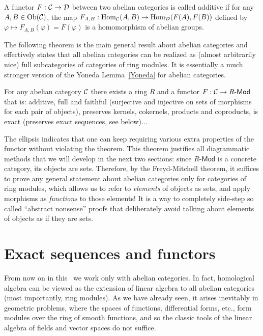 \begin{defn}
    A functor $F:\mathcal{C}\to\mathcal{D}$ between two abelian categories is called additive if for any $A,B\in\operatorname{Ob}(\mathcal{C})$, the map $F_{A,B}:\operatorname{Hom}_{\mathcal{C}}(A,B)\to \operatorname{Hom}_{\mathcal{D}}(F(A),F(B))$ defined by $\varphi\mapsto F_{A,B}(\varphi)=F(\varphi)$ is a homomorphism of abelian groups.
\end{defn}

The following theorem is the main general result about abelian categories and effectively states that all abelian categories can be realized as (almost arbitrarily nice) full subcategories of categories of ring modules. It is essentially a much stronger version of the Yoneda Lemma~\ref{Yoneda} for abelian categories.

\begin{thm}\label{Theorem!Freyd-Mitchell}
    For any abelian category $\mathcal{C}$ there exists a ring $R$ and a functor $F:\mathcal{C}\to R\text{-}\mathsf{Mod}$ that is: additive, full and faithful (surjective and injective on sets of morphisms for each pair of objects), preserves kernels, cokernels, products and coproducts, is exact (preserves exact sequences, see below)...
\end{thm}
The ellipsis indicates that one can keep requiring various extra properties of the functor without violating the theorem. This theorem justifies all diagrammatic methods that we will develop in the next two sections: since $R\text{-}\mathsf{Mod}$ is a concrete category, its objects are sets. Therefore, by the Freyd-Mitchell theorem, it suffices to prove any general statement about abelian categories only for categories of ring modules, which allows us to refer to \emph{elements} of objects as sets, and apply morphisms as \emph{functions} to those elements! It is a way to completely side-step so called ``abstract nonsense'' proofs that deliberately avoid talking about elements of objects as if they are sets.




\section{Exact sequences and functors}

From now on in this \partt\ we work only with abelian categories. In fact, homological algebra can be viewed as the extension of linear algebra to all abelian categories (most importantly, ring modules). As we have already seen, it arises inevitably in geometric problems, where the spaces of functions, differential forms, etc., form modules over the ring of smooth functions, and so the classic tools of the linear algebra of fields and vector spaces do not suffice.

